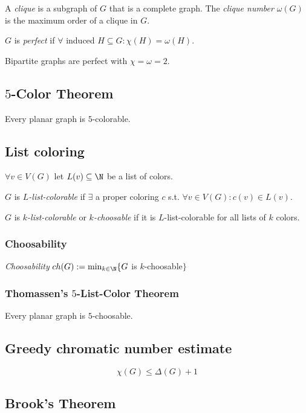 A \emph{clique} is a subgraph of $G$ that is a complete graph.
The \emph{clique number} $\omega(G)$ is the maximum order of a clique in $G$.

\spacing

$G$ is \emph{perfect} if $\forall$ induced $H \subseteq G : \chi(H) = \omega(H)$.

Bipartite graphs are perfect with $\chi = \omega = 2$.

\subsection*{$5$-Color Theorem}

Every planar graph is $5$-colorable.

\subsection*{List coloring}

$\forall v \in V(G)$ let $L(v) \subseteq \N$ be a list of colors.

$G$ is \emph{$L$-list-colorable} if $\exists$ a proper coloring $c$ s.t. $\forall v \in V(G) : c(v) \in L(v)$.

\spacing

$G$ is \emph{$k$-list-colorable} or \emph{$k$-choosable} if it is $L$-list-colorable for all lists of $k$ colors.

\subsubsection*{Choosability}

\emph{Choosability} $ch(G) := \min_{k\in\N}\{ G$ is $k$-choosable$\}$

\subsubsection*{Thomassen's $5$-List-Color Theorem}

Every planar graph is $5$-choosable.

\subsection*{Greedy chromatic number estimate}

$$\chi(G) \leq \Delta(G)+1$$

\subsection*{Brook's Theorem}

